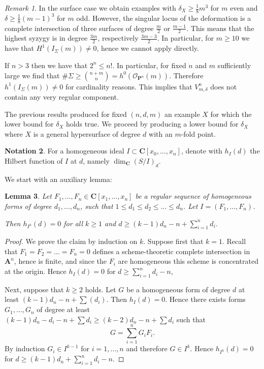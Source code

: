 \documentclass{amsart}
\newcommand{\Ps}{\mathbf{P}}
\newcommand{\As}{\mathbf{A}}
\newcommand{\C}{\mathbf{C}}
\newtheorem{lemma}{Lemma}[section]
\theoremstyle{definition}
\newtheorem{notation}[lemma]{Notation}
\theoremstyle{remark}
\newtheorem{remark}[lemma]{Remark}
\begin{document}
\begin{remark}
In the surface case we obtain examples  with  $\delta_X\geq \frac{1}{8} m^3$  for $m$ even and $\delta\geq \frac{1}{8}(m-1)^3$ for $m$ odd. However, the singular locus of the deformation  is a complete intersection of three surfaces of degree $\frac{m}{2}$ or $\frac{m-1}{2}$. This means that the highest syzygy is in degree $\frac{3m}{2}$, respectively $\frac{3m-3}{2}$. In particular, for $m\geq 10$ we have that $H^1(I_{\Sigma}(m))\neq 0$, hence we cannot apply  \cite[Theorem 3.3]{CiGa26} directly.

If $n>3$ then we have that $2^n\leq n!$. In particular, for fixed $n$ and $m$ sufficiently large we find that $\#\Sigma \geq \binom{n+m}{n}=h^0(\mathcal{O}_{\Ps^n}(m))$. Therefore $h^1(I_{\Sigma}(m))\neq 0$ for cardinality reasons. This implies that $V^n_{m,\delta}$ does not contain any very regular component.%
\end{remark}

The previous results produced for fixed $(n,d,m)$ an example $X$ for which the lower bound for $\delta_X$ holds true.
We  proceed by producing a lower bound for $\delta_X$ where $X$ is  a general hypersurface of degree $d$ with an $m$-fold point.

\begin{notation}
For a homogeneous ideal $I\subset \C[x_0,\dots,x_n]$, denote with $h_I(d)$ the Hilbert function of $I$ at $d$, namely $\dim_{\C} (S/I)_d$.
\end{notation}

We start with an auxiliary lemma:

\begin{lemma} Let $F_1,\dots,F_n\in \C[x_1,\dots,x_n]$ be a regular sequence of homogeneous forms of degree $d_1,\dots,d_n$, such that $1\leq d_1\leq d_2\leq \dots\leq d_n$. Let $I=(F_1,\dots,F_n)$.

Then  $h_{I^{k}}(d)=0$ for all $k\geq 1$ and $d\geq (k-1)d_n-n+ \sum_{i=1}^n d_i$.
\end{lemma}

\begin{proof} We prove the claim by induction on $k$.
Suppose first that $k=1$. Recall that $F_1=F_2=\dots=F_n=0$ defines a scheme-theoretic complete intersection in $\As^n$, hence is finite, and since the $F_i$ are homogeneous this scheme is concentrated at the origin.
Hence $h_I(d)=0$ for $d\geq \sum_{i=1}^n d_i-n$,

Next, suppose  that $k\geq 2$ holds. Let $G$ be a homogeneous form of degree $d$ at least $(k-1)d_n-n+\sum (d_i)$. Then $h_I(d)=0$. Hence there exists forms $G_1,\dots, G_n$  of degree at least $(k-1)d_n-d_i-n+\sum d_i\geq (k-2)d_n-n+\sum d_i$ such that
\[ G=\sum_{i=1}^n G_iF_i.\]
By induction $G_i\in  I^{k-1}$ for $i=1,\dots,n$ and  therefore $G\in I^k$. Hence $h_{I^k}(d)=0$ for $d\geq (k-1)d_n+ \sum_{i=1}^n d_i-n$.
\end{proof}
\end{document}
